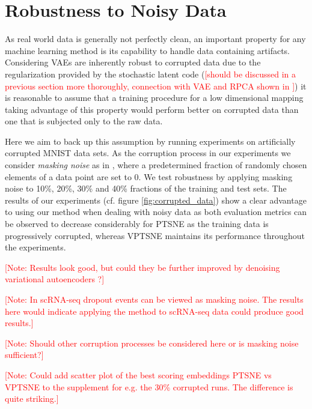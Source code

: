\section{Robustness to Noisy Data}

As real world data is generally not perfectly clean, an important property for any machine learning method is its capability to handle data containing artifacts. Considering VAEs are inherently robust to corrupted data due to the regularization provided by the stochastic latent code (\textcolor{red}{[should be discussed in a previous section more thoroughly, connection with VAE and RPCA \citep{rpca_1, rpca_2} shown in \citep{hidden_talents_of_the_vae}]}) it is reasonable to assume that a training procedure for a low dimensional mapping taking advantage of this property would perform better on corrupted data than one that is subjected only to the raw data.

Here we aim to back up this assumption by running experiments on artificially corrupted MNIST data sets. As the corruption process in our experiments we consider \textit{masking noise} as in \cite{stacked_denoising_ae}, where a predetermined fraction of randomly chosen elements of a data point are set to 0. We test robustness by applying masking noise to 10\%, 20\%, 30\% and 40\% fractions of the training and test sets. The results of our experiments (cf. figure \ref{fig:corrupted_data}) show a clear advantage to using our method when dealing with noisy data as both evaluation metrics can be observed to decrease considerably for PTSNE as the training data is progressively corrupted, whereas VPTSNE maintains its performance throughout the experiments.

\noindent \textcolor{red}{[Note: Results look good, but could they be further improved by denoising variational autoencoders \citep{denoising_vae}?]}

\noindent \textcolor{red}{[Note: In scRNA-seq dropout events can be viewed as masking noise. The results here would indicate applying the method to scRNA-seq data could produce good results.]}

\noindent \textcolor{red}{[Note: Should other corruption processes be considered here or is masking noise sufficient?]}

\noindent \textcolor{red}{[Note: Could add scatter plot of the best scoring embeddings PTSNE vs VPTSNE to the supplement for e.g. the 30\% corrupted runs. The difference is quite striking.]}


